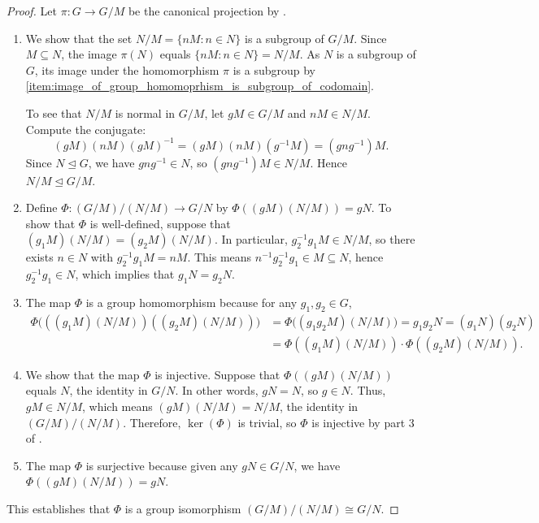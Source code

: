 \begin{proof}
    Let $\pi : G \to G/M$ be the canonical projection by .

    \begin{enumerate}
        \item We show that the set $N/M = \{nM : n \in N\}$ is a subgroup of $G/M$. Since $M \subseteq N$, the image $\pi(N)$ equals $\{nM : n \in N\} = N/M$. As $N$ is a subgroup of $G$, its image under the homomorphism $\pi$ is a subgroup by \eqref{item:image_of_group_homomoprhism_is_subgroup_of_codomain}.

        To see that $N/M$ is normal in $G/M$, let $gM \in G/M$ and $nM \in N/M$. Compute the conjugate:
        $$(gM)(nM)(gM)^{-1} = (gM)(nM)(g^{-1}M) = (gn g^{-1})M.$$
        Since $N \trianglelefteq G$, we have $gn g^{-1} \in N$, so $(gn g^{-1})M \in N/M$. Hence $N/M \trianglelefteq G/M$.

        \item Define $\Phi : (G/M)/(N/M) \to G/N$ by $\Phi((gM)(N/M)) = gN$. To show that $\Phi$ is well-defined, suppose that $(g_1 M)(N/M) = (g_2 M)(N/M)$. In particular, $g_2^{-1} g_1 M \in N/M$, so there exists $n \in N$ with $g_2^{-1} g_1 M = nM$. This means $n^{-1} g_2^{-1} g_1 \in M \subseteq N$, hence $g_2^{-1} g_1 \in N$, which implies that $g_1 N = g_2 N$.

        \item The map $\Phi$ is a group homomorphism because for any $g_1, g_2 \in G$,
        \begin{align*}
        \Phi\bigl(((g_1 M)(N/M))((g_2 M)(N/M))\bigr) &= \Phi\bigl((g_1 g_2 M)(N/M)\bigr) = g_1 g_2 N = (g_1 N)(g_2 N) \\
        &= \Phi((g_1 M)(N/M)) \cdot \Phi((g_2 M)(N/M)).
        \end{align*}

        \item We show that the map $\Phi$ is injective. Suppose that $\Phi((gM)(N/M))$ equals $N$, the identity in $G/N$. In other words, $gN = N$, so $g \in N$. Thus, $gM \in N/M$, which means $(gM)(N/M) = N/M$, the identity in $(G/M)/(N/M)$. Therefore, $\operatorname{ker}(\Phi)$ is trivial, so $\Phi$ is injective by part 3 of .

        \item The map $\Phi$ is surjective because given any $gN \in G/N$, we have $\Phi((gM)(N/M)) = gN$.
    \end{enumerate}

    This establishes that $\Phi$ is a group isomorphism $(G/M)/(N/M) \cong G/N$.
\end{proof}

